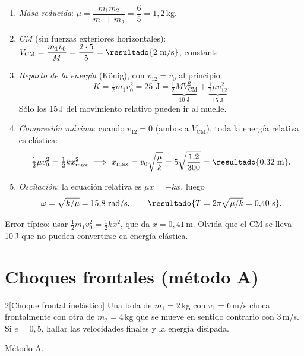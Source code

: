 \documentclass[11pt,a4paper,twoside]{article}
\newcommand{\cm}{_{\mathrm{CM}}}
\newcommand{\metodo}[1]{{\color{tenue}\small\sffamily #1}\par\nopagebreak}
\begin{document}
\begin{resolucion}
\begin{enumerate}
  \item \emph{Masa reducida}: $\mu=\dfrac{m_{1}m_{2}}{m_{1}+m_{2}}=\dfrac{6}{5}=1{,}2$\,kg.
  \item \emph{CM} (sin fuerzas exteriores horizontales):
        $V\cm=\dfrac{m_{1}v_{0}}{M}=\dfrac{2\cdot5}{5}=\resultado{2\text{ m/s}}$, constante.
  \item \emph{Reparto de la energía} (König), con $v_{12}=v_{0}$ al principio:
        \[
          K=\tfrac12m_{1}v_{0}^{2}=25\text{ J}=\underbrace{\tfrac12MV\cm^{2}}_{10\text{ J}}+\underbrace{\tfrac12\mu v_{12}^{2}}_{15\text{ J}} .
        \] Sólo los 15\,J del movimiento relativo pueden ir al muelle.
  \item \emph{Compresión máxima}: cuando $v_{12}=0$ (ambos a $V\cm$), toda la energía relativa es elástica:
        \[
          \tfrac12\mu v_{0}^{2}=\tfrac12kx_{\max}^{2}\ \Longrightarrow\ x_{\max}=v_{0}\sqrt{\frac{\mu}{k}}=5\sqrt{\frac{1{,}2}{300}}=\resultado{0{,}32\text{ m}} .
        \]
  \item \emph{Oscilación}: la ecuación relativa es $\mu\ddot x=-kx$, luego
        \[
          \omega=\sqrt{k/\mu}=15{,}8\text{ rad/s},\qquad \resultado{T=2\pi\sqrt{\mu/k}=0{,}40\text{ s}} .
        \]
\end{enumerate}
Error típico: usar $\tfrac12m_{1}v_{0}^{2}=\tfrac12kx^{2}$, que da $x=0{,}41$\,m. Olvida que el CM se lleva 10\,J que no pueden convertirse en energía elástica.
\end{resolucion}

\section{Choques frontales (método A)}

\begin{problema}{2}[Choque frontal inelástico]
Una bola de $m_{1}=2$\,kg con $v_{1}=6$\,m/s choca frontalmente con otra de $m_{2}=4$\,kg que se
mueve en sentido contrario con $3$\,m/s. Si $e=0{,}5$, hallar las velocidades finales y la energía disipada.
\end{problema}
\metodo{Método A.}
\end{document}
